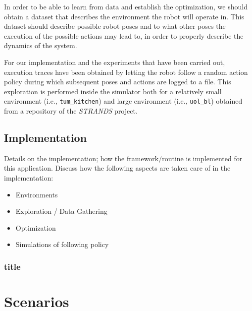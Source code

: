 In order to be able to learn  from data and establish the optimization, we should obtain a dataset that  describes the environment the robot will operate in.
This dataset should describe possible robot poses and to what other poses the execution of the possible actions may lead to, in order to properly describe the dynamics of the system.

For our implementation and the experiments that have been carried out, execution traces have been obtained by letting the robot follow a random action policy during which subsequent poses and actions are logged to a file.
This exploration is performed inside the simulator both for a relatively small environment (i.e., \texttt{tum\_kitchen}) and  large environment (i.e., \texttt{uol\_bl}) obtained from a repository of the \textit{STRANDS} project.


\subsection{Implementation}
\label{sec:implementation}

Details on the implementation; how the framework/routine is implemented for this application. Discuss how the following aspects are taken care of in the implementation:
\begin{itemize}
	\item Environments
	\item Exploration / Data Gathering
	\item Optimization
	\item Simulations of following policy
\end{itemize}

\subsubsection{title}

\section{Scenarios}
\label{sec:scenarios}


